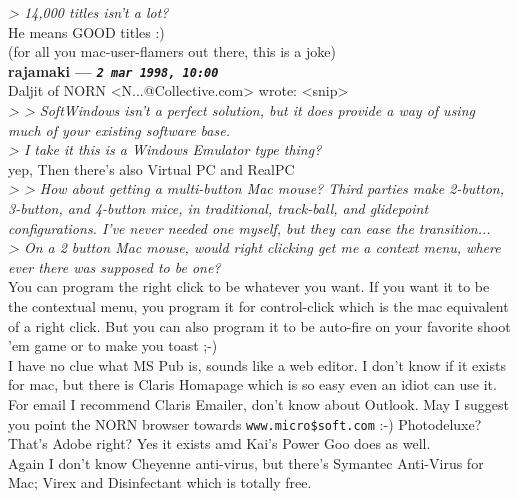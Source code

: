 \documentclass[11pt,twoside,a4paper]{article}
\begin{document}
\begin{multicols*}{2}
\emph{> 14,000 titles isn't a lot?}~\\

He means GOOD titles :)~\\

(for all you mac-user-flamers out there, this is a joke)~\\

 
		
	
		
\textbf{rajamaki --- \emph{\texttt{2 mar 1998, 10:00}}}~\\

Daljit of NORN <N...@Collective.com> wrote:
<snip>~\\
\emph{> > SoftWindows isn't a perfect solution, but it does provide a way of using much of your existing software base.}~\\

\emph{> I take it this is a Windows Emulator type thing?}~\\

yep, Then there's also Virtual PC and RealPC~\\

\emph{> > How about getting a multi-button Mac mouse? Third parties make 2-button, 3-button, and 4-button mice, in traditional, track-ball, and glidepoint configurations. I've never needed one myself, but they can ease the transition...}~\\

\emph{> On a 2 button Mac mouse, would right clicking get me a context menu, where ever there was supposed to be one?}~\\

You can program the right click to be whatever you want. If you want it to be the contextual menu, you program it for control-click which is the mac equivalent of a right click. But you can also program it to be auto-fire on your favorite shoot 'em game or to make you toast ;-)~\\

I have no clue what MS Pub is, sounds like a web editor. I don't know if it exists for mac, but there is Claris Homapage which is so easy even an idiot can use it. For email I recommend Claris Emailer, don't know about Outlook. May I suggest you point the NORN browser towards \texttt{www.micro\$soft.com} :-) Photodeluxe? That's Adobe right? Yes it exists amd Kai's Power Goo does as well.~\\

Again I don't know Cheyenne anti-virus, but there's Symantec Anti-Virus for Mac; Virex and Disinfectant which is totally free.~\\


\end{multicols*}
\end{document}
